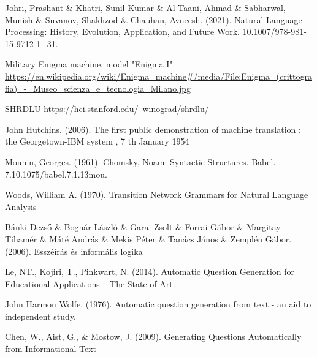 \documentclass[12pt,a4paper]{report}
\begin{document}


\newpage

\pagestyle{empty}



\cleardoublepage
{}
\tableofcontents
\cleardoublepage
{}

\newpage

\pagestyle{fancy}









\begin{thebibliography}{100}
 Johri, Prashant \& Khatri, Sunil Kumar \& Al-Taani, Ahmad \& Sabharwal, Munish \& Suvanov, Shakhzod \& Chauhan, Avneesh. (2021). Natural Language Processing: History, Evolution, Application, and Future Work. 10.1007/978-981-15-9712-1\_31.

 Military Enigma machine, model "Enigma I"  \url{https://en.wikipedia.org/wiki/Enigma_machine#/media/File:Enigma_(crittografia)_-_Museo_scienza_e_tecnologia_Milano.jpg}

 SHRDLU https://hci.stanford.edu/~winograd/shrdlu/

 John Hutchins. (2006). The first public demonstration of machine translation : the Georgetown-IBM system , 7 th January 1954

 Mounin, Georges. (1961). Chomsky, Noam: Syntactic Structures. Babel. 7.10.1075/babel.7.1.13mou.

 Woods, William A. (1970). Transition Network Grammars for Natural Language Analysis

 Bánki Dezső \& Bognár László \& Garai Zsolt \& Forrai Gábor \& Margitay Tihamér \& Máté András \& Mekis Péter \& Tanács János \& Zemplén Gábor. (2006). Esszéírás és informális logika

 Le, NT., Kojiri, T., Pinkwart, N. (2014). Automatic Question Generation for Educational Applications – The State of Art.

 John Harmon Wolfe. (1976). Automatic question generation from text - an aid to independent study.

 Chen, W., Aist, G., \& Mostow, J. (2009). Generating Questions Automatically from Informational Text


\end{thebibliography}
\end{document}
